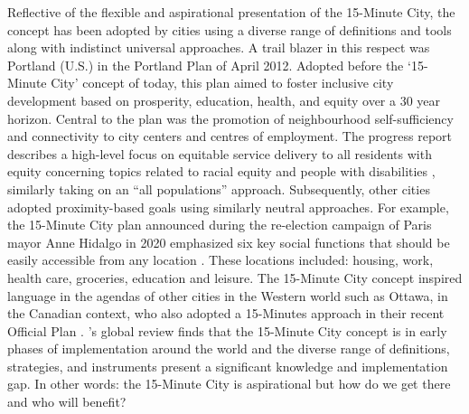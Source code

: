 \documentclass[
  authoryear,
  preprint,
  3p]{elsarticle}
\begin{document}
Reflective of the flexible and aspirational presentation of the
15-Minute City, the concept has been adopted by cities using a diverse
range of definitions and tools along with indistinct universal
approaches. A trail blazer in this respect was Portland (U.S.) in the
Portland Plan \citep{city_of_portland_20minute_2010} of April 2012.
Adopted before the `15-Minute City' concept of today, this plan aimed to
foster inclusive city development based on prosperity, education,
health, and equity over a 30 year horizon. Central to the plan was the
promotion of neighbourhood self-sufficiency and connectivity to city
centers and centres of employment. The progress report describes a
high-level focus on equitable service delivery to all residents with
equity concerning topics related to racial equity and people with
disabilities \citep{portland_government_portland_2017}, similarly taking
on an ``all populations'' approach. Subsequently, other cities adopted
proximity-based goals using similarly neutral approaches. For example,
the 15-Minute City plan announced during the re-election campaign of
Paris mayor Anne Hidalgo in 2020 emphasized six key social functions
that should be easily accessible from any location
\citep{ville_de_paris_paris_2022}. These locations included: housing,
work, health care, groceries, education and leisure. The 15-Minute City
concept inspired language in the agendas of other cities in the Western
world such as Ottawa, in the Canadian context, who also adopted a
15-Minutes approach in their recent Official Plan
\citep{ville_dottawa_quartier_2021}.
\citet{teixeiraClassifying15minuteCities2024}'s global review finds that
the 15-Minute City concept is in early phases of implementation around
the world and the diverse range of definitions, strategies, and
instruments present a significant knowledge and implementation gap. In
other words: the 15-Minute City is aspirational but how do we get there
and who will benefit?
\end{document}
